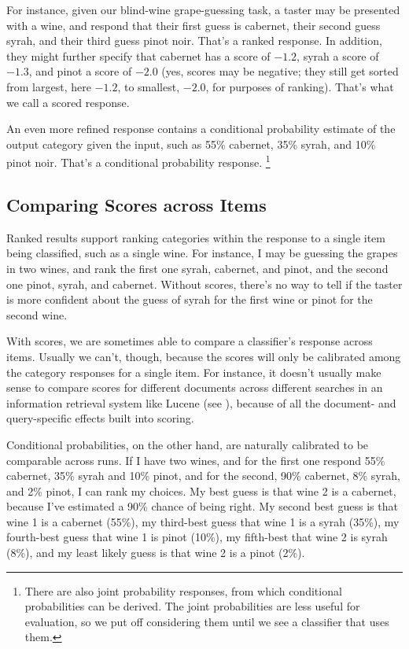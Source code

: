 For instance, given our blind-wine grape-guessing task, a taster may
be presented with a wine, and respond that their first guess is
cabernet, their second guess syrah, and their third guess pinot noir.
That's a ranked response.  In addition, they might further specify
that cabernet has a score of $-1.2$, syrah a score of $-1.3$, and
pinot a score of $-2.0$ (yes, scores may be negative; they still get
sorted from largest, here $-1.2$, to smallest, $-2.0$, for
purposes of ranking).  That's what we call a scored response.  

An even more refined response contains a conditional probability
estimate of the output category given the input, such as 55\%
cabernet, 35\% syrah, and 10\% pinot noir.  That's a conditional
probability response.%
%
\footnote{There are also joint probability responses, from which
  conditional probabilities can be derived.  The joint probabilities
  are less useful for evaluation, so we put off considering them until
  we see a classifier that uses them.}

\subsection{Comparing Scores across Items}

Ranked results support ranking categories within the response to a
single item being classified, such as a single wine.  For instance, I
may be guessing the grapes in two wines, and rank the first one syrah,
cabernet, and pinot, and the second one pinot, syrah, and cabernet.
Without scores, there's no way to tell if the taster is more confident
about the guess of syrah for the first wine or pinot for the second
wine.

With scores, we are sometimes able to compare a classifier's response
across items.  Usually we can't, though, because the scores will only
be calibrated among the category responses for a single item.  For
instance, it doesn't usually make sense to compare scores for
different documents across different searches in an information
retrieval system like Lucene (see ), because of all
the document- and query-specific effects built into scoring.

Conditional probabilities, on the other hand, are naturally calibrated
to be comparable across runs.  If I have two wines, and for the first
one respond 55\% cabernet, 35\% syrah and 10\% pinot, and for the
second, 90\% cabernet, 8\% syrah, and 2\% pinot, I can rank my
choices.  My best guess is that wine 2 is a cabernet, because I've
estimated a 90\% chance of being right.  My second best guess is that
wine 1 is a cabernet (55\%), my third-best guess that wine 1 is a
syrah (35\%), my fourth-best guess that wine 1 is pinot (10\%), my
fifth-best that wine 2 is syrah (8\%), and my least likely guess is
that wine 2 is a pinot (2\%).

